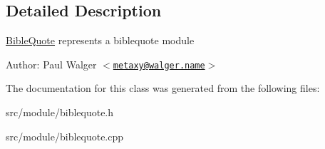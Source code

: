 \subsection{Detailed Description}
\hyperlink{classBibleQuote}{BibleQuote} represents a biblequote module

\begin{Desc}
\item[Author:]Paul Walger $<$\href{mailto:metaxy@walger.name}{\tt metaxy@walger.name}$>$ \end{Desc}


The documentation for this class was generated from the following files:\begin{CompactItemize}
\item 
src/module/biblequote.h\item 
src/module/biblequote.cpp\end{CompactItemize}
